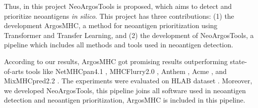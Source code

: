 Thus, in this project NeoArgosTools is proposed, which aims to detect and prioritize neoantigens 
\textit{in silico}. This project has three contributions: (1) the development ArgosMHC, a method for neoantigen prioritization using Transformer and Transfer Learning, and (2) the development of NeoArgosTools, a pipeline which includes all methods and tools used in neoantigen detection. 

According to our results, ArgosMHC got promising results outperforming state-of-arts tools like NetMHCpan4.1 \cite{reynisson2020netmhcpan}, MHCFlurry2.0 \cite{o2020mhcflurry}, Anthem \cite{mei2021anthem}, Acme \cite{hu2019acme}, and MixMHCpred2.2 \cite{gfeller2023improved}. The experiments were evaluated on HLAB dataset \cite{zhang2022hlab}. Moreover, we developed NeoArgosTools, this pipeline joins all software used in neoantigen detection and neoantigen prioritization, ArgosMHC is included in this pipeline.

